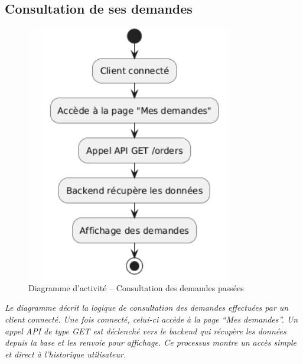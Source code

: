 \vspace{1em}

\subsection*{Consultation de ses demandes}
\begin{figure}[H]
\centering
\includegraphics[width=0.55\linewidth]{figures/Activité – Consultation de ses demandes.png}
\caption{Diagramme d’activité – Consultation des demandes passées}
\end{figure}
\textit{Le diagramme décrit la logique de consultation des demandes effectuées par un client connecté. Une fois connecté, celui-ci accède à la page “Mes demandes”. Un appel API de type GET est déclenché vers le backend qui récupère les données depuis la base et les renvoie pour affichage. Ce processus montre un accès simple et direct à l’historique utilisateur.}

\vspace{1em}

